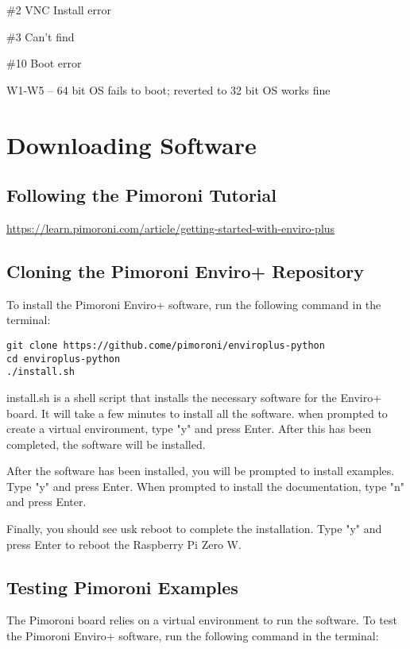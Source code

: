 \documentclass{article}
\begin{document}
\#2 VNC Install error

\#3 Can't find

\#10 Boot error

W1-W5 -- 64 bit OS fails to boot; reverted to 32 bit OS works fine


\section{Downloading Software}

\subsection{Following the Pimoroni Tutorial}

\url{https://learn.pimoroni.com/article/getting-started-with-enviro-plus}

\subsection{Cloning the Pimoroni Enviro+ Repository}

To install the Pimoroni Enviro+ software, run the following command in the terminal:

\begin{verbatim}
git clone https://github.come/pimoroni/enviroplus-python
cd enviroplus-python
./install.sh
\end{verbatim}

install.sh is a shell script that installs the necessary software for the Enviro+ board. It will take a few minutes to install all the software. when prompted to create a virtual environment, type "y" and press Enter. After this has been completed, the software will be installed. 

After the software has been installed, you will be prompted to install examples. Type "y" and press Enter.
When prompted to install the documentation, type "n" and press Enter. 

Finally, you should see usk reboot to complete the installation. Type "y" and press Enter to reboot the Raspberry Pi Zero W.

\subsection{Testing Pimoroni Examples}

The Pimoroni board relies on a virtual environment to run the software. To test the Pimoroni Enviro+ software, run the following command in the terminal:
\end{document}
